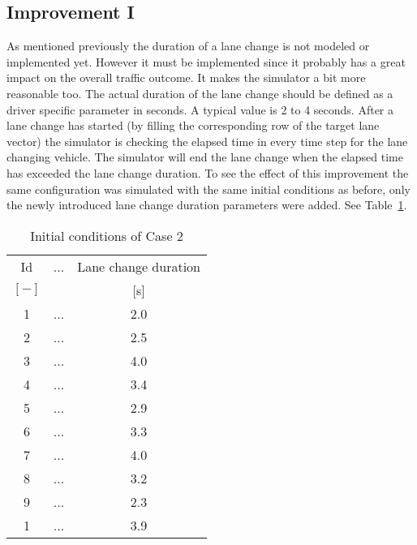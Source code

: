 		\subsection{Improvement I}
		As mentioned previously the duration of a lane change is not modeled or implemented yet. However it must be implemented since it probably has a great impact on the overall traffic outcome. It makes the simulator a bit more reasonable too. The actual duration of the lane change should be defined as a driver specific parameter in seconds. A typical value is 2 to 4 seconds. After a lane change has started (by filling the corresponding row of the target lane vector) the simulator is checking the elapsed time in every time step for the lane changing vehicle. The simulator will end the lane change when the elapsed time has exceeded the lane change duration. To see the effect of this improvement the same configuration was simulated with the same initial conditions as before, only the newly introduced lane change duration parameters were added. See Table~\ref{tab:lane_change_duration}.
		\begin{table}
			\begin{center}
				\begin{tabular}{ |c|c|c| }
					\hline
					Id & ... & Lane change duration\\
					$[-]$ & & [s]\\
					\hline
					1 & ... & 2.0\\
					2 & ... & 2.5\\
					3 & ... & 4.0\\
					4 & ... & 3.4\\
					5 & ... & 2.9\\
					6 & ... & 3.3\\
					7 & ... & 4.0\\
					8 & ... & 3.2\\
					9 & ... & 2.3\\
					1 & ... & 3.9\\
					\hline
				\end{tabular}
			\end{center}
			\caption{Initial conditions of Case 2}
			\label{tab:lane_change_duration}
		\end{table}
		
